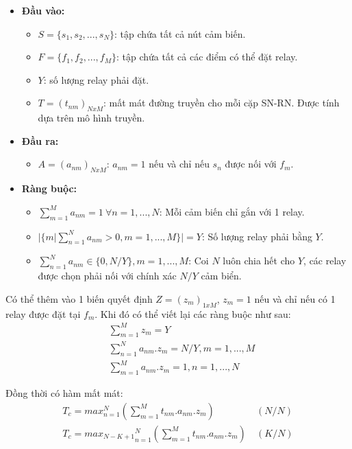 \documentclass[hidelinks, 11pt, a4paper]{report}
\begin{document}
\begin{itemize}
    \item {
        \textbf{Đầu vào:}
        \begin{itemize}
            \item $S = \{s_1, s_2, ..., s_N \}$: tập chứa tất cả nút cảm biến.
            \item $F = \{f_1, f_2, ..., f_M \}$: tập chứa tất cả các điểm có thể đặt relay.
            \item $Y$: số lượng relay phải đặt.
            \item $T = (t_{nm})_{NxM}$: mất mát đường truyền cho mỗi cặp SN-RN. Được tính dựa trên mô hình truyền.
        \end{itemize}
    }
    \item {
        \textbf{Đầu ra:}
        \begin{itemize}
            \item $A = (a_{nm})_{NxM}$: $a_{nm} = 1$ nếu và chỉ nếu $s_n$ được nối với $f_m$.
        \end{itemize}
    }
    \item {
        \textbf{Ràng buộc:}
        \begin{itemize}
            \item $\sum_{m=1}^{M} a_{nm} = 1\ \forall n = 1,...,N$: Mỗi cảm biến chỉ gắn với 1 relay.
            \item $|\{ m | \sum_{n=1}^N a_{nm} > 0, m = 1,...,M \}| = Y$: Số lượng relay phải bằng $Y$.
            \item $\sum_{n=1}^N a_{nm} \in \{ 0, N/Y \}, m = 1,...,M$: Coi $N$ luôn chia hết cho $Y$, các relay được chọn phải nối với chính xác $N/Y$ cảm biển.
        \end{itemize}
    }
\end{itemize}

Có thể thêm vào 1 biến quyết định $Z = (z_m)_{1xM}$, $z_m = 1$ nếu và chỉ nếu có 1 relay được đặt tại $f_m$. Khi đó có thể viết lại các ràng buộc như sau:
\begin{align*}
    & \sum_{m=1}^M z_m = Y\\
    & \sum_{n=1}^N a_{nm} . z_m = N/Y, m = 1,...,M\\
    & \sum_{m=1}^M a_{nm} . z_m = 1, n = 1,...,N
\end{align*}

Đồng thời có hàm mất mát:
\begin{align*}
    T_c = max_{n=1}^N (\sum_{m=1}^M t_{nm} . a_{nm} . z_{m})\ & (N / N)\\
    T_c = {max_{N-K+1}}_{n=1}^N (\sum_{m=1}^M t_{nm} . a_{nm} . z_{m})\ & (K / N)
\end{align*}
\end{document}
